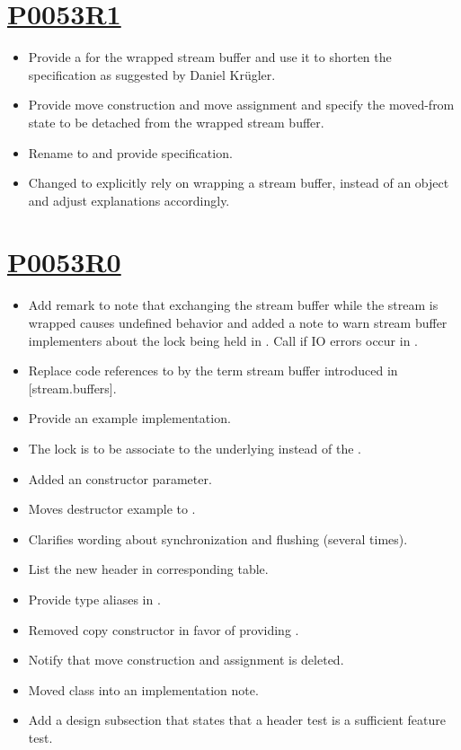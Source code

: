 \documentclass[ebook,11pt,article]{memoir}
\begin{document}
\section{\href{https://wg21.link/P0053R1}{P0053R1}}
\begin{itemize}
\item Provide a  for the wrapped stream buffer and use it to shorten the specification as suggested by Daniel Kr\"ugler.
\item Provide move construction and move assignment and specify the moved-from state to be detached from the wrapped stream buffer.
\item Rename  to  and provide  specification.
\item Changed to explicitly rely on wrapping a stream buffer, instead of an  object and adjust explanations accordingly.
\end{itemize}

\section{\href{https://wg21.link/P0053R0}{P0053R0}}
\begin{itemize}
\item Add remark to note that exchanging the stream buffer while the stream is wrapped causes undefined behavior and added a note to warn stream buffer implementers about the lock being held in . Call  if IO errors occur in .
\item Replace code references to  by the term stream buffer introduced in [stream.buffers].
\item Provide an example implementation.
\item The lock is to be associate to the underlying  instead of the .
\item Added an  constructor parameter.
\item Moves destructor example to .
\item Clarifies wording about synchronization and flushing (several times).
\item List the new header in corresponding table.
\item Provide type aliases in .
\item Removed copy constructor in favor of providing .
\item Notify that move construction and assignment is deleted.
\item Moved class  into an implementation note.
\item Add a design subsection that states that a header test is a sufficient feature test.
\end{itemize}
\end{document}
